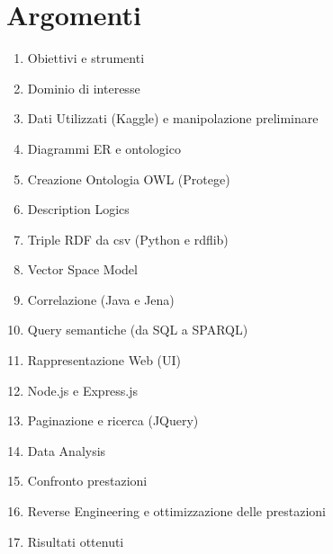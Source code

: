 \documentclass[Lau,binding=0.6cm,noexaminfo]{sapthesis}
\begin{document}
\chapter*{Argomenti}
\begin{enumerate}
  \item Obiettivi e strumenti
  \item Dominio di interesse
  \item Dati Utilizzati (Kaggle) e manipolazione preliminare
  \item Diagrammi ER e ontologico
  \item Creazione Ontologia OWL (Protege)
  \item Description Logics
  \item Triple RDF da csv (Python e rdflib)
  \item Vector Space Model
  \item Correlazione (Java e Jena)
  \item Query semantiche (da SQL a SPARQL)
  \item Rappresentazione Web (UI)
  \item Node.js e Express.js
  \item Paginazione e ricerca (JQuery)
  \item Data Analysis
  \item Confronto prestazioni
  \item Reverse Engineering e ottimizzazione delle prestazioni
  \item Risultati ottenuti
\end{enumerate}

\backmatter
\cleardoublepage
\end{document}
